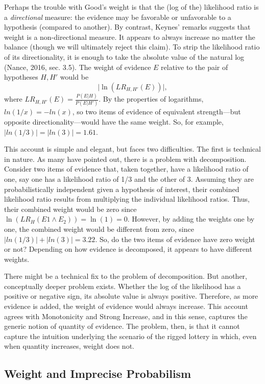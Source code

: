 \documentclass[
  10pt,
  dvipsnames,enabledeprecatedfontcommands]{scrartcl}
\begin{document}
Perhaps the trouble with Good's weight is that the (log of the)
likelihood ratio is a \emph{directional} measure: the evidence may be
favorable or unfavorable to a hypothesis (compared to another). By
contrast, Keynes' remarks suggests that weight is a non-directional
measure. It appears to always increase no matter the balance (though we
will ultimately reject this claim). To strip the likelihood ratio of its
directionality, it is enough to take the absolute value of the natural
log (Nance, 2016, sec. 3.5). The weight of evidence \(E\) relative to
the pair of hypotheses \(H, H'\) would be
\[\vert \ln (LR_{H, H'}(E)) \vert, \] where
\(LR_{H, H'}(E)=\frac{P(E \vert H)}{P(E \vert H')}\). By the properties
of logarithms, \(ln(1/x) = -ln(x)\), so two items of evidence of
equivalent strength---but opposite directionality---would have the same
weight. So, for example, \(|ln(1/3)|= |ln(3)| = 1.61\).

This account is simple and elegant, but faces two difficulties. The
first is technical in nature. As many have pointed out, there is a
problem with decomposition. Consider two items of evidence that, taken
together, have a likelihood ratio of one, say one has a likelihood ratio
of 1/3 and the other of 3. Assuming they are probabilistically
independent given a hypothesis of interest, their combined likelihood
ratio results from multiplying the individual likelihood ratios. Thus,
their combined weight would be zero since
\(\ln (LR_H(E1 \wedge E_2))=\ln (1) = 0\). However, by adding the
weights one by one, the combined weight would be different from zero,
since \(|ln(1/3)| + |ln(3)| = 3.22\). So, do the two items of evidence
have zero weight or not? Depending on how evidence is decomposed, it
appears to have different weights.

There might be a technical fix to the problem of decomposition. But
another, conceptually deeper problem exists. Whether the log of the
likelihood has a positive or negative sign, its absolute value is always
positive. Therefore, as more evidence is added, the weight of evidence
would always increase. This account agrees with Monotonicity and Strong
Increase, and in this sense, captures the generic notion of quantity of
evidence. The problem, then, is that it cannot capture the intuition
underlying the scenario of the rigged lottery in which, even when
quantity increases, weight does not.

\hypertarget{weight-and-imprecise-probabilism}{%
\subsection{Weight and Imprecise
Probabilism}\label{weight-and-imprecise-probabilism}}
\end{document}
